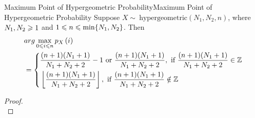 \documentclass{elegantbook}
\begin{document}
\begin{theorem}{Maximum Point of Hypergeometric Probability}{Maximum Point of Hypergeometric Probability}
Suppose $X\sim\ \mathrm{hypergeometric}(N_1,N_2,n)$, where $N_1,N_2\geqslant1$ and $1\leqslant n\leqslant\min\{N_1,N_2\}$. Then
$$
\begin{aligned}
&arg\max\limits_{0\ls i\ls n}{p_X\left(i\right)}\\
&=\left\{\begin{aligned}
&\frac{(n+1)(N_1+1)}{N_1+N_2+2}-1 \text{ or } \frac{(n+1)(N_1+1)}{N_1+N_2+2},     \ \text{if }  \frac{(n+1)(N_1+1)}{N_1+N_2+2}\in\mz   \\
&\left\lfloor \frac{(n+1)(N_1+1)}{N_1+N_2+2}\right\rfloor, \ \text{if }  \frac{(n+1)(N_1+1)}{N_1+N_2+2}\notin\mz  
\end{aligned}\right.   
\end{aligned}
$$
\end{theorem}

\begin{proof}
\\[4cm]\vspace{0.01cm}
\end{proof}
\end{document}
